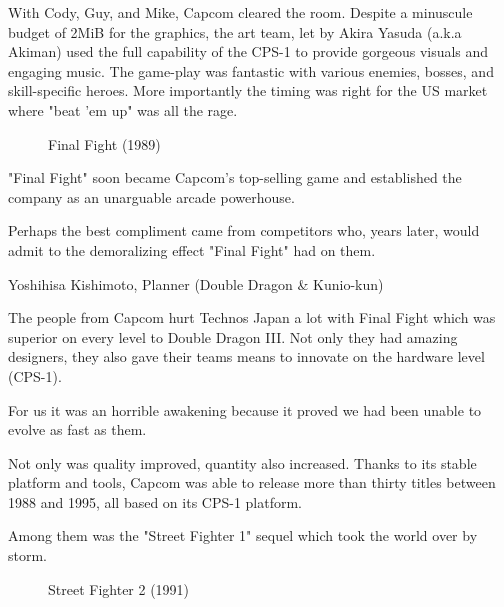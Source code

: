With Cody, Guy, and Mike, Capcom cleared the room. Despite a minuscule budget of 2MiB for the graphics, the art team, let by Akira Yasuda (a.k.a Akiman) used the full capability of the CPS-1 to provide gorgeous visuals and engaging music. The game-play was fantastic with various enemies, bosses, and skill-specific heroes. More importantly the timing was right for the US market where "beat 'em up" was all the rage.



  

\label{nin_ff}
 \begin{figure}[H]
\caption*{Final Fight (1989)}
\end{figure}

"Final Fight" soon became Capcom's top-selling game\cite{birth_of_chunli} and established the company as an unarguable arcade powerhouse.

\pagebreak

Perhaps the best compliment came from competitors who, years later, would admit to the demoralizing effect "Final Fight" had on them.

\begin{q}{Yoshihisa Kishimoto, Planner (Double Dragon \& Kunio-kun)\cite{dd} }
  

  The people from Capcom hurt Technos Japan a lot with Final Fight which was superior on every level to Double Dragon III. Not only they had amazing designers, they also gave their teams means to innovate on the hardware level (CPS-1). 

  For us it was an horrible awakening because it proved we had been unable to evolve as fast as them.
  \end{q}



Not only was quality improved, quantity also increased. Thanks to its stable platform and tools, Capcom was able to release more than thirty titles between 1988 and 1995, all based on its CPS-1 platform. 

Among them was the "Street Fighter 1" sequel which took the world over by storm.

\label{nin_sf2}
\begin{figure}[H]
\caption*{Street Fighter 2 (1991)}
\end{figure}

